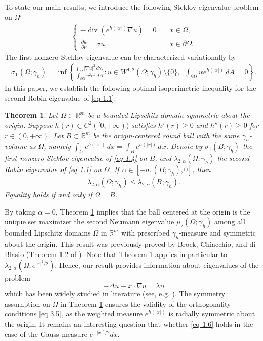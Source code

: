 \documentclass[11pt,leqno]{amsart}
\newtheorem{theorem}{Theorem}[section]\newtheorem{thm}[theorem]{Theorem}
\def\a{\alpha}
\def\l{\lambda}
\def\p{\partial}
\def\R{\mathbb{R}}
\def\div{\operatorname{div}}
\def \p {\partial}
\numberwithin{equation}{section}
\begin{document}
To state our main results, we introduce the  following Steklov  eigenvalue problem on $\Omega$ 
\begin{align}\label{eq 1.4}
\begin{cases}
      -\div (e^{h(|x|)}\nabla u)=0 \quad & x\in \Omega,\\
        \frac{\p u}{\p \nu}=\sigma u, \quad & x\in \p \Omega.
\end{cases}    
\end{align}
The first nonzero Steklov eigenvalue can be characterized  variationally by
\begin{align}
\sigma_1(\Omega; \gamma_h)=\inf\left\{ \frac{\int_{\Omega} |\nabla u|^2 \, d\gamma_h}{\int_{\partial \Omega}  u^2 e^{h}\, dA} : u\in W^{1,2}(\Omega; \gamma_h )\setminus\{0\},\;\; \int_{\partial \Omega} ue^{h(|x|)}\ dA=0 \right\}.
\end{align}
 In this paper,  we establish the following optimal isoperimetric inequality for the second Robin eigenvalue of \eqref{eq 1.1}.
\begin{theorem}\label{thm 1}
Let $\Omega\subset \R^m$ be a bounded  Lipschitz domain symmetric about the origin. Suppose $h(r)\in C^2([0, +\infty))$ satisfies  $h'(r)\ge 0$ and $h''(r)\ge 0$ for $r\in (0, +\infty)$. Let  $B \subset \R^m$  be the  origin-centered  round ball with the same $\gamma_h$-volume as $\Omega$, namely $ \int_{\Omega} e^{h(|x|)}\, dx= \int_{B} e^{h(|x|)}\, dx$. Denote by $\sigma_1(B; \gamma_h)$ the first nonzero Steklov eigenvalue of \eqref{eq 1.4} on $B$, and $\l_{2,\a}(\Omega; \gamma_h)$ the second Robin eigenvalue of \eqref{eq 1.1} on $\Omega$.  If  $\a \in [-\sigma_1(B; \gamma_h), 0]$, then 
\begin{align}\label{eq 1.6}
\l_{2,\a}(\Omega; \gamma_h) \le \l_{2,\a}(B; \gamma_h).
\end{align}
Equality holds  if and only if 
$\Omega=B$. 
\end{theorem}
By taking $\a=0$, Theorem \ref{thm 1} implies that the ball centered at the
origin is the unique set maximizer the second Neumann eigenvalue $\mu_2(\Omega;\gamma_h)$ among all bounded Lipschitz domains $\Omega$ in $\R^m$ with prescribed $\gamma_h$-measure and symmetric about the origin. This result was previously  proved by Brock, Chiacchio, and di Blasio (Theorem 1.2 of \cite{BCB16}). Note that Theorem \ref{thm 1} applies in particular  to $\l_{2, \a}(\Omega; e^{|x|^2/2})$. Hence, our result provides information about  eigenvalues of the problem
$$
-\Delta u-x\cdot \nabla u=\l u
$$
which has been widely studied in literature (see, e.g. \cite{BCM12, BMP13}). 
The symmetry assumption on $\Omega$ in Theorem \ref{thm 1}
 ensures the validity of  the orthogonality conditions \eqref{eq 3.5}, as the weighted measure $e^{h(|x|)}$ is  radially
 symmetric about the origin.
It remains an interesting question that whether \eqref{eq 1.6} 
holds in the case of the Gauss measure $e^{-|x|^2/2}dx$.   
\end{document}

